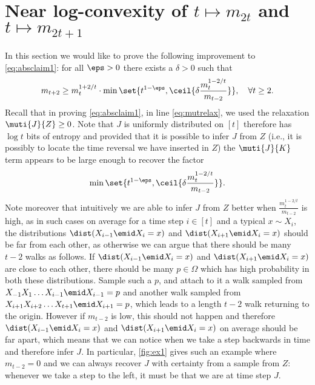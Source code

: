 \section{Near log-convexity of 
         $t\mapsto m_{2t}$ and $t\mapsto m_{2t+1}$}
\label{sec:logconvex}
In this section we would like to prove the following
improvement to \autoref{eq:absclaim1}: for all $\eps>0$ 
there exists a $\delta>0$ such that
\begin{align}
m_{t+2}
\ge m_{t}^{1+2/t}\cdot
\min\set{t^{1-\eps}, \ceil{\delta\frac{m_t^{1-2/t}}{m_{t-2}}}},
\quad \forall t \ge 2.
\label{eq:logconv}
\end{align}
%
Recall that in proving \autoref{eq:absclaim1}, 
in line \ref{eq:mutrelax}, we used the relaxation 
$\muti{J}{Z}\ge 0$.
Note that $J$ is uniformly distributed on $[t]$
therefore has $\log t$ bits of entropy and provided
that it is possible to infer $J$ from $Z$ 
(i.e., it is possibly to locate the time reversal we 
have inserted in $Z$)
the $\muti{J}{K}$ term appears to be large enough to 
recover the factor
\begin{align*}
\min\set{t^{1-\eps}, 
  \ceil{\delta\frac{m_t^{1-2/t}}{m_{t-2}}}}.
\end{align*}
Note moreover that intuitively we are able to 
infer $J$ from $Z$ better when 
$\frac{m_t^{1-2/t}}{m_{t-2}}$ is high, 
as in such cases on average for a time step $i\in[t]$ 
and a typical $x\sim X_i$,
the distributions $\dist(X_{i-1}\emid X_i=x)$ and
$\dist(X_{i+1}\emid X_i=x)$ should be far from each other, 
as otherwise we can argue that there should be many $t-2$ 
walks as follows. If $\dist(X_{i-1}\emid X_i=x)$ and
$\dist(X_{i+1}\emid X_i=x)$ are close to each other, 
there should be many $p\in\Omega$ which has high probability
in both
these distributions. Sample such a $p$, and 
attach to it a walk sampled from $X_{-1}X_1\ldots X_{i-1}\emid X_{i-1}=p$ 
and another walk sampled from $X_{i+1}X_{i+2}\ldots X_{t+1}\emid X_{i+1}=p$,
which leads to a length $t-2$ walk returning to the origin.
However if $m_{t-2}$ is low, this should not happen and therefore
$\dist(X_{i-1}\emid X_i=x)$ and
$\dist(X_{i+1}\emid X_i=x)$ on average should be far apart, 
which means that we can notice when we take a step backwards in time
and therefore infer $J$. In particular, \autoref{fig:ex1} 
gives such an example where $m_{t-2}=0$ and we can always
recover $J$ with certainty from a sample from $Z$: whenever we take
a step to the left, it must be that we are at time step $J$.

